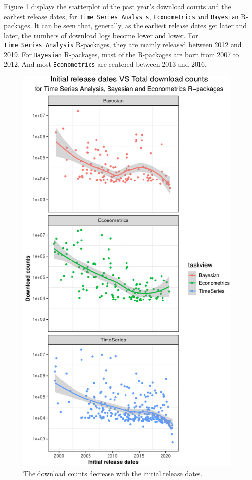 \documentclass[
]{book}
\begin{document}
Figure \ref{fig:release-downloads} displays the scatterplot of the past year's download counts and the earliest release dates, for \texttt{Time\ Series\ Analysis}, \texttt{Econometrics} and \texttt{Bayesian} R-packages. It can be seen that, generally, as the earliest release dates get later and later, the numbers of download logs become lower and lower. For \texttt{Time\ Series\ Analysis} R-packages, they are mainly released between 2012 and 2019. For \texttt{Bayesian} R-packages, most of the R-packages are born from 2007 to 2012. And most \texttt{Econometrics} are centered between 2013 and 2016.



\begin{figure}

{\centering \includegraphics{figures/release-downloads-1} 

}

\caption{The download counts decrease with the initial release dates.}\label{fig:release-downloads}
\end{figure}
\end{document}
